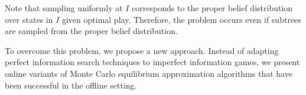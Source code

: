 \documentclass{aamas2015}
\begin{document}
Note that sampling uniformly at $I$ corresponds to the proper belief distribution over states in $I$ given optimal play. Therefore, the problem occurs even if subtrees are sampled from the proper belief distribution. 

To overcome this problem, we propose a new approach. Instead of adapting perfect information search techniques to imperfect information games, we present online variants of Monte Carlo equilibrium approximation algorithms that have been successful in the offline setting. 





\end{document}
